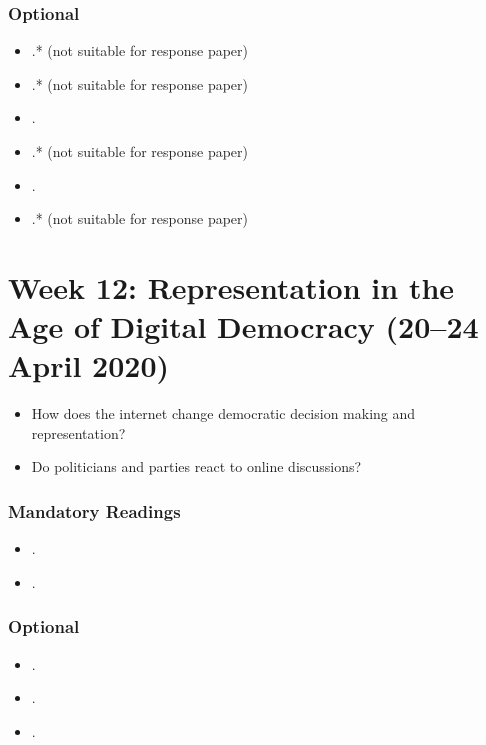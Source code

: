 \documentclass[abstract=on,parskip=full,headings=standardclasses,fontsize=11pt,paper=a4]{scrartcl}
\begin{document}
\subsubsection*{Optional}
\begin{itemize}
\item {}.* (not suitable for response paper)
\item {}.* (not suitable for response paper)
\item {}.
\item {}.* (not suitable for response paper)
\item {}.
\item {}.* (not suitable for response paper)
\end{itemize}



\section{Week 12: Representation in the Age of Digital Democracy (20--24 April 2020)}


\begin{itemize}
\renewcommand\labelitemi{--}
\item How does the internet change democratic decision making and representation?
\item Do politicians and parties react to online discussions?
\end{itemize}

\subsubsection*{Mandatory Readings}
\begin{itemize}
\item {}.
\item {}.
\end{itemize}


\subsubsection*{Optional}
\begin{itemize}
\item {}.
\item {}.
\item {}.
\end{itemize}


\end{document}
